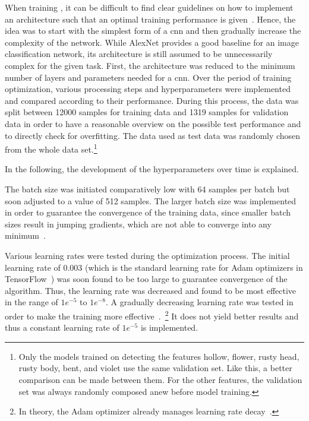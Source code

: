 When training , it can be difficult to find clear guidelines on how to implement an architecture such that an optimal training performance is given~\citep{heaton2015aifh,geron2019hands,bettilyon2018classify}. Hence, the idea was to start with the simplest form of a \acrshort{cnn} and then gradually increase the complexity of the network. While AlexNet provides a good baseline for an image classification network, its architecture is still assumed to be unnecessarily complex for the given task. First, the architecture was reduced to the minimum number of layers and parameters needed for a \acrshort{cnn}. Over the period of training optimization, various processing steps and hyperparameters were implemented and compared according to their performance. During this process, the data was split between 12000 samples for training data and 1319 samples for validation data in order to have a reasonable overview on the possible test performance and to directly check for overfitting. The data used as test data was randomly chosen from the whole data set.\footnote{Only the models trained on detecting the features hollow, flower, rusty head, rusty body, bent, and violet use the same validation set. Like this, a better comparison can be made between them. For the other features, the validation set was always randomly composed anew before model training.}

\bigskip
In the following, the development of the hyperparameters over time is explained.
 
The batch size was initiated comparatively low with 64 samples per batch but soon adjusted to a value of 512 samples. The larger batch size was implemented in order to guarantee the convergence of the training data, since smaller batch sizes result in jumping gradients, which are not able to converge into any minimum~\citep{bengio2012practical}.
 
Various learning rates were tested during the optimization process. The initial learning rate of 0.003 (which is the standard learning rate for Adam optimizers in TensorFlow~\citep{kingma2014adam,geron2019hands}) was soon found to be too large to guarantee convergence of the algorithm. Thus, the learning rate was decreased and found to be most effective in the range of \(1e^{-5}\) to \(1e^{-8}\). A gradually decreasing learning rate was tested in order to make the training more effective~\citep{bengio2012practical}.~\footnote{In theory, the Adam optimizer already manages learning rate decay~\citep{kingma2014adam}.} It does not yield better results and thus a constant learning rate of \(1e^{-5}\) is implemented.
 
